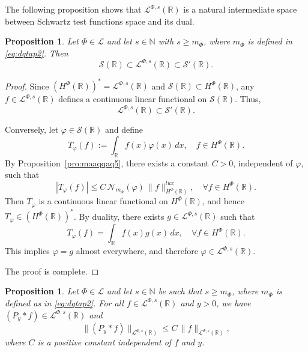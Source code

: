 \documentclass[a4paper,12pt,intlimits,oneside]{amsart}
\newtheorem{proposition}[theorem]{Proposition}
\theoremstyle{definition}
\numberwithin{equation}{section}
\theoremstyle{definition}
\begin{document}
\medskip
\noindent

The following proposition shows that $\mathcal{L}^{\Phi,s}(\mathbb{R})$ is a natural intermediate space between Schwartz test functions space and its dual.

\begin{proposition}\label{pro:main2aaoammqdp1}
Let $\Phi \in \mathscr{L}$ and let $s \in \mathbb{N}$ with $s \geq m_{\Phi}$, where $m_{\Phi}$ is defined in \eqref{eq:dqtap2}. Then
\[
\mathscr{S}(\mathbb{R}) \subset \mathcal{L}^{\Phi,s}(\mathbb{R}) \subset \mathscr{S}'(\mathbb{R}).
\]
\end{proposition}




\begin{proof}
Since $(H^{\Phi}(\mathbb{R}))^* = \mathcal{L}^{\Phi,s}(\mathbb{R})$ and $\mathscr{S}(\mathbb{R}) \subset H^{\Phi}(\mathbb{R})$, any $f \in \mathcal{L}^{\Phi,s}(\mathbb{R})$ defines a continuous linear functional on $\mathscr{S}(\mathbb{R})$. Thus,
\[
\mathcal{L}^{\Phi,s}(\mathbb{R}) \subset \mathscr{S}'(\mathbb{R}).
\]

Conversely, let $\varphi \in \mathscr{S}(\mathbb{R})$ and define
\[
T_{\varphi}(f) := \int_{\mathbb{R}} f(x)\varphi(x)\,dx, \quad f \in H^{\Phi}(\mathbb{R}).
\]
By Proposition~\ref{pro:maaqqaq5}, there exists a constant $C>0$, independent of $\varphi$, such that
\[
|T_{\varphi}(f)| \leq C\,\mathcal{N}_{m_{\Phi}}(\varphi)\,\|f\|_{H^{\Phi}(\mathbb{R})}^{lux},
\quad \forall f \in H^{\Phi}(\mathbb{R}).
\]
Then $T_{\varphi}$ is a continuous linear functional on $H^{\Phi}(\mathbb{R})$, and hence $T_{\varphi} \in (H^{\Phi}(\mathbb{R}))^*$. By duality, there exists $g \in \mathcal{L}^{\Phi,s}(\mathbb{R})$ such that
\[
T_{\varphi}(f) = \int_{\mathbb{R}} f(x)g(x)\,dx, \quad \forall f \in H^{\Phi}(\mathbb{R}).
\]
This implies $\varphi = g$ almost everywhere, and therefore $\varphi \in \mathcal{L}^{\Phi,s}(\mathbb{R})$.

\medskip

The proof is complete.
\end{proof}




 
  \begin{proposition}\label{pro:main2aaoammqdp}
  Let $\Phi \in \mathscr{L}$ and let $s \in \mathbb{N}$ be such that $s \geq m_{\Phi}$, where $m_{\Phi}$ is defined as in \eqref{eq:dqtap2}. For all $f \in \mathcal{L}^{\Phi,s}(\mathbb{R})$ and $y>0$, we have $(P_{y}\ast f) \in \mathcal{L}^{\Phi,s}(\mathbb{R})$ and 
  \begin{equation}\label{eq:dqtaqmhqmp2}
   \|(P_{y}\ast f)\|_{\mathcal{L}^{\Phi,s}(\mathbb{R})} \leq C\, \| f\|_{\mathcal{L}^{\Phi,s}(\mathbb{R})},
  \end{equation}
  where $C$ is a positive constant independent of $f$ and $y$.
  \end{proposition}
  
\end{document}
